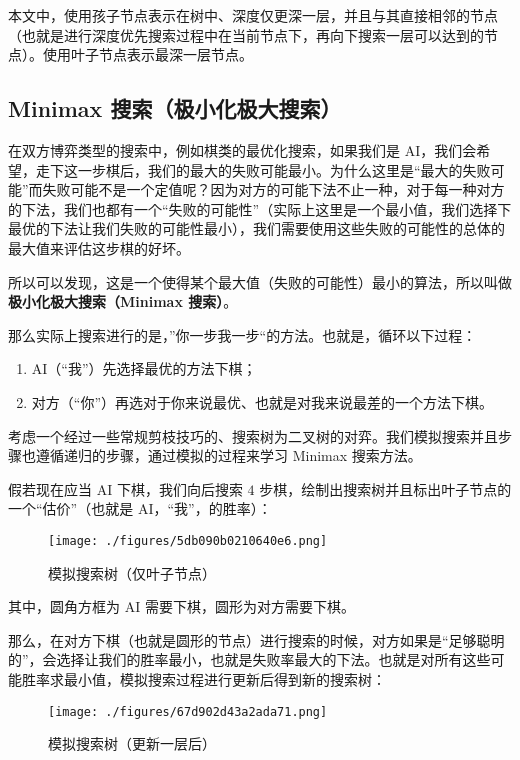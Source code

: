 
\begin{issues}
\issueTODO
\end{issues}

本文中，使用孩子节点表示在树中、深度仅更深一层，并且与其直接相邻的节点（也就是进行深度优先搜索过程中在当前节点下，再向下搜索一层可以达到的节点）。使用叶子节点表示最深一层节点。

\subsection{Minimax 搜索（极小化极大搜索）}
在双方博弈类型的搜索中，例如棋类的最优化搜索，如果我们是 AI，我们会希望，走下这一步棋后，我们的最大的失败可能最小。为什么这里是“最大的失败可能”而失败可能不是一个定值呢？因为对方的可能下法不止一种，对于每一种对方的下法，我们也都有一个“失败的可能性”（实际上这里是一个最小值，我们选择下最优的下法让我们失败的可能性最小），我们需要使用这些失败的可能性的总体的最大值来评估这步棋的好坏。

所以可以发现，这是一个使得某个最大值（失败的可能性）最小的算法，所以叫做\textbf{极小化极大搜索（Minimax 搜索）}。

那么实际上搜索进行的是，”你一步我一步“的方法。也就是，循环以下过程：
\begin{enumerate}
\item AI（“我”）先选择最优的方法下棋；
\item 对方（“你”）再选对于你来说最优、也就是对我来说最差的一个方法下棋。
\end{enumerate}
考虑一个经过一些常规剪枝技巧的、搜索树为二叉树的对弈。我们模拟搜索并且步骤也遵循递归的步骤，通过模拟的过程来学习 Minimax 搜索方法。

假若现在应当 AI 下棋，我们向后搜索 $4$ 步棋，绘制出搜索树并且标出叶子节点的一个“估价”（也就是 AI，“我”，的胜率）：
\begin{figure}[ht]
\centering
\texttt{[image: ./figures/5db090b0210640e6.png]}
\caption{模拟搜索树（仅叶子节点）} \label{fig_mmsab_1}
\end{figure}
其中，圆角方框为 AI 需要下棋，圆形为对方需要下棋。

那么，在对方下棋（也就是圆形的节点）进行搜索的时候，对方如果是“足够聪明的”，会选择让我们的胜率最小，也就是失败率最大的下法。也就是对所有这些可能胜率求最小值，模拟搜索过程进行更新后得到新的搜索树：
\begin{figure}[ht]
\centering
\texttt{[image: ./figures/67d902d43a2ada71.png]}
\caption{模拟搜索树（更新一层后）} \label{fig_mmsab_3}
\end{figure}

